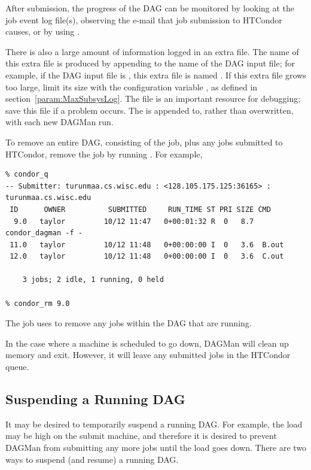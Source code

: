 After submission, the progress of the DAG can be monitored
by looking at the job event log file(s),
observing the e-mail that job submission to HTCondor causes,
or by using  .

There is also a large amount of information logged in an extra file.
The name of this extra file is produced by appending
 to the name of the DAG input file; 
for example, if the DAG input file is , 
this extra file is named .
If this extra file grows too large, limit its size
with the configuration variable ,
as defined in section~\ref{param:MaxSubsysLog}.
The  file is an important resource for
debugging; save this file if a problem occurs. 
The  is appended to, rather than overwritten, 
with each new DAGMan run.

To remove an entire DAG, consisting of the  job, 
plus any jobs submitted to HTCondor,
remove the  job by running .
For example,
\footnotesize
\begin{verbatim}
% condor_q
-- Submitter: turunmaa.cs.wisc.edu : <128.105.175.125:36165> : turunmaa.cs.wisc.edu
 ID      OWNER          SUBMITTED     RUN_TIME ST PRI SIZE CMD
  9.0   taylor         10/12 11:47   0+00:01:32 R  0   8.7  condor_dagman -f -
 11.0   taylor         10/12 11:48   0+00:00:00 I  0   3.6  B.out
 12.0   taylor         10/12 11:48   0+00:00:00 I  0   3.6  C.out

    3 jobs; 2 idle, 1 running, 0 held

% condor_rm 9.0
\end{verbatim}
\normalsize

The  job uses 
to remove any jobs within the DAG that are running.

In the case where a
machine is scheduled to go down,
DAGMan will clean up memory and exit.
However, it will leave any submitted jobs
in the HTCondor queue.

\subsection{\label{sec:DagSuspend}Suspending a Running DAG}

It may be desired to temporarily suspend a running DAG.
For example, the load may be high on the submit machine,
and therefore it is desired to prevent DAGMan from
submitting any more jobs until the load goes down.
There are two ways to suspend (and resume) a running DAG.

